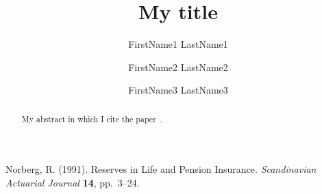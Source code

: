 
\title{My title} %

\author[1]{\small FirstName1 LastName1}     %

\author[1, 2]{\small FirstName2 LastName2}
\author[2]{\small FirstName3 LastName3}



\maketitle

\begin{abstract}
My abstract in which I cite the paper~\cite{paper1}.
\end{abstract}



\begin{thebibliography}{1}
Norberg, R. (1991). Reserves in Life and Pension Insurance. \textit{Scandinavian Actuarial Journal} \textbf{14}, pp.~3--24.
\end{thebibliography}
